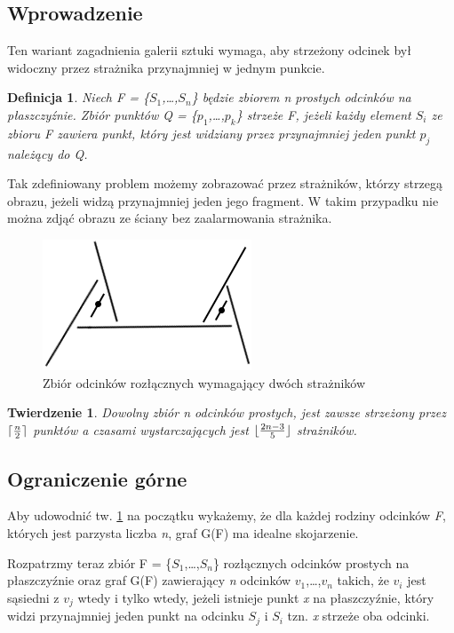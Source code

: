 \documentclass[brudnopis]{xmgr}
\DeclarePairedDelimiter\ceil{\lceil}{\rceil}
\DeclarePairedDelimiter\floor{\lfloor}{\rfloor}
\newtheorem{Twierdzenie}{Twierdzenie}
\newtheorem{Definicja}{Definicja}
\begin{document}
\subsection{Wprowadzenie}
Ten wariant zagadnienia galerii sztuki wymaga, aby strzeżony odcinek był widoczny przez strażnika przynajmniej w jednym punkcie. 
\begin{Definicja}
Niech F = \{$S_1$,\ldots,$S_n$\} będzie zbiorem \textit{n} prostych odcinków na płaszczyźnie. Zbiór punktów Q = \{$p_1$,\ldots,$p_k$\} strzeże F, jeżeli każdy element $S_i$ ze zbioru F zawiera punkt, który jest widziany przez przynajmniej jeden punkt $p_j$ należący do Q.
\end{Definicja}
Tak zdefiniowany problem możemy zobrazować przez strażników, którzy strzegą obrazu, jeżeli widzą przynajmniej jeden jego fragment. W takim przypadku nie można zdjąć obrazu ze ściany bez zaalarmowania strażnika.
\begin{figure}[ht!]
 \centering
  \includegraphics{rysunki/rozlaczny_dwoch_straznikow.png}
  \caption{Zbiór odcinków rozłącznych wymagający dwóch strażników}
\end{figure} 

\begin{Twierdzenie}\label{straznicy strzezenie}
Dowolny zbiór n odcinków prostych, jest zawsze strzeżony przez $\ceil{\frac{n}{2}}$ punktów a czasami wystarczających jest $\floor{\frac{2n-3}{5}}$ strażników.
\end{Twierdzenie}

\subsection{Ograniczenie górne}
Aby udowodnić tw. \ref{straznicy strzezenie} na początku wykażemy, że dla każdej rodziny odcinków \textit{F}, których jest parzysta liczba \textit{n}, graf G(F) ma idealne skojarzenie.

Rozpatrzmy teraz zbiór F = \{$S_1$,\ldots,$S_n$\} rozłącznych odcinków prostych na płaszczyźnie oraz graf G(F) zawierający \textit{n} odcinków $v_1$,\ldots,$v_n$ takich, że $v_i$ jest sąsiedni z $v_j$ wtedy i tylko wtedy, jeżeli istnieje punkt \textit{x} na płaszczyźnie, który widzi przynajmniej jeden punkt na odcinku $S_j$ i $S_i$ tzn. \textit{x} strzeże oba odcinki.
\end{document}
